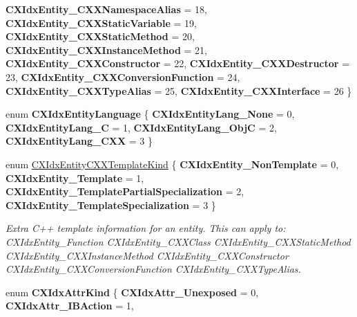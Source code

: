 \begin{DoxyCompactItemize}
{\bfseries C\+X\+Idx\+Entity\+\_\+\+C\+X\+X\+Namespace\+Alias} = 18, 
{\bfseries C\+X\+Idx\+Entity\+\_\+\+C\+X\+X\+Static\+Variable} = 19, 
\newline
{\bfseries C\+X\+Idx\+Entity\+\_\+\+C\+X\+X\+Static\+Method} = 20, 
{\bfseries C\+X\+Idx\+Entity\+\_\+\+C\+X\+X\+Instance\+Method} = 21, 
{\bfseries C\+X\+Idx\+Entity\+\_\+\+C\+X\+X\+Constructor} = 22, 
{\bfseries C\+X\+Idx\+Entity\+\_\+\+C\+X\+X\+Destructor} = 23, 
\newline
{\bfseries C\+X\+Idx\+Entity\+\_\+\+C\+X\+X\+Conversion\+Function} = 24, 
{\bfseries C\+X\+Idx\+Entity\+\_\+\+C\+X\+X\+Type\+Alias} = 25, 
{\bfseries C\+X\+Idx\+Entity\+\_\+\+C\+X\+X\+Interface} = 26
 \}
\item 
\mbox{\label{group__CINDEX__HIGH_ga586068b110ab11094f40eff0b92fc578}} 
enum {\bfseries C\+X\+Idx\+Entity\+Language} \{ {\bfseries C\+X\+Idx\+Entity\+Lang\+\_\+\+None} = 0, 
{\bfseries C\+X\+Idx\+Entity\+Lang\+\_\+C} = 1, 
{\bfseries C\+X\+Idx\+Entity\+Lang\+\_\+\+ObjC} = 2, 
{\bfseries C\+X\+Idx\+Entity\+Lang\+\_\+\+C\+XX} = 3
 \}
\item 
\mbox{\label{group__CINDEX__HIGH_gaffb304a99b36f147738b3349e7aa22cb}} 
enum \hyperlink{group__CINDEX__HIGH_gaffb304a99b36f147738b3349e7aa22cb}{C\+X\+Idx\+Entity\+C\+X\+X\+Template\+Kind} \{ {\bfseries C\+X\+Idx\+Entity\+\_\+\+Non\+Template} = 0, 
{\bfseries C\+X\+Idx\+Entity\+\_\+\+Template} = 1, 
{\bfseries C\+X\+Idx\+Entity\+\_\+\+Template\+Partial\+Specialization} = 2, 
{\bfseries C\+X\+Idx\+Entity\+\_\+\+Template\+Specialization} = 3
 \}\begin{DoxyCompactList}\small\item\em Extra C++ template information for an entity. This can apply to\+: C\+X\+Idx\+Entity\+\_\+\+Function C\+X\+Idx\+Entity\+\_\+\+C\+X\+X\+Class C\+X\+Idx\+Entity\+\_\+\+C\+X\+X\+Static\+Method C\+X\+Idx\+Entity\+\_\+\+C\+X\+X\+Instance\+Method C\+X\+Idx\+Entity\+\_\+\+C\+X\+X\+Constructor C\+X\+Idx\+Entity\+\_\+\+C\+X\+X\+Conversion\+Function C\+X\+Idx\+Entity\+\_\+\+C\+X\+X\+Type\+Alias. \end{DoxyCompactList}
\item 
\mbox{\label{group__CINDEX__HIGH_gacafef874c0a53de1d38805ec7ca9790a}} 
enum {\bfseries C\+X\+Idx\+Attr\+Kind} \{ {\bfseries C\+X\+Idx\+Attr\+\_\+\+Unexposed} = 0, 
{\bfseries C\+X\+Idx\+Attr\+\_\+\+I\+B\+Action} = 1, 

\end{DoxyCompactItemize}
